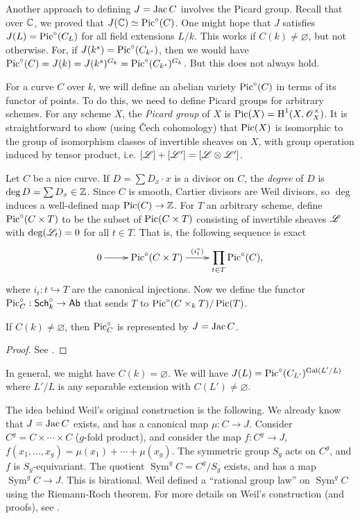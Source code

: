 \documentclass{article}
\begin{document}
Another approach to defining $J=\operatorname{Jac} C$ involves the Picard group. Recall 
that over $\mathbb{C}$, we proved that $J(\mathbb{C})\simeq\operatorname{Pic}^\circ(C)$. 
One might hope that $J$ satisfies $J(L)=\operatorname{Pic}^\circ(C_L)$ for all field 
extensions $L/k$. This works if $C(k)\ne\varnothing$, but not otherwise. For, 
if $J(k^s)=\operatorname{Pic}^\circ(C_{k^s})$, then we would have 
$\operatorname{Pic}^\circ(C) = J(k) = J(k^s)^{G_k} = \operatorname{Pic}^\circ(C_{k^s})^{G_k}$. But this 
does not always hold. 

For a curve $C$ over $k$, we will define an abelian variety $\operatorname{Pic}^\circ(C)$ in 
terms of its functor of points. To do this, we need to define Picard groups for 
arbitrary schemes. For any scheme $X$, the \emph{Picard group} of $X$ is 
$\operatorname{Pic}(X)=\operatorname{H}^1(X,\mathscr{O}_X^\times)$. It is straightforward to show (using \v Cech 
cohomology) that $\operatorname{Pic}(X)$ is isomorphic to the group of isomorphism classes of 
invertible sheaves on $X$, with group operation induced by tensor product, i.e. 
$[\mathscr{L}] + [\mathscr{L'}] = [\mathscr{L}\otimes \mathscr{L}']$. 

Let $C$ be a nice curve. If $D=\sum D_x\cdot x$ is a divisor on $C$, the 
\emph{degree} of $D$ is $\deg D=\sum D_x\in \mathbb{Z}$. Since $C$ is smooth, Cartier 
divisors are Weil divisors, so $\deg$ induces a well-defined map 
$\operatorname{Pic}(C)\to \mathbb{Z}$. For $T$ an arbitrary scheme, define 
$\operatorname{Pic}^\circ(C\times T)$ to be the subset of $\operatorname{Pic}(C\times T)$ consisting of 
invertible sheaves $\mathscr{L}$ with $\deg(\mathscr{L}_t)=0$ for all $t\in T$. That is, the 
following sequence is exact 
\[\xymatrix{
  0 \ar[r] 
    & \pic^\circ(C\times T) \ar[r]^-{(i_t^*)}
    & \displaystyle\prod_{t\in T} \pic^\circ (C)\text{,}
}\]
where $i_t:t\hookrightarrow T$ are the canonical injections. Now we define the 
functor $\operatorname{Pic}_C^\circ:\mathsf{Sch}_k^\circ\to\mathsf{Ab}$ that sends $T$ to 
$\operatorname{Pic}^\circ(C\times_k T)/\operatorname{Pic}(T)$. 

\begin{theorem}
If $C(k)\ne \varnothing$, then $\operatorname{Pic}_C^\circ$ is represented by $J=\operatorname{Jac} C$.
\end{theorem}
\begin{proof}
See \cite[III.1.2]{mi}.
\end{proof}

In general, we might have $C(k)=\varnothing$. We will have 
$J(L)=\operatorname{Pic}^\circ(C_{L'})^{\operatorname{Gal}(L'/L)}$ where $L'/L$ is any separable extension 
with $C(L')\ne\varnothing$. 

The idea behind Weil's original construction is the following. We already 
know that $J=\operatorname{Jac} C$ exists, and has a canonical map $\mu:C\to J$. Consider 
$C^g=C\times\cdots\times C$ ($g$-fold product), and consider the map 
$f:C^g\to J$, $f(x_1,\dotsc,x_g)=\mu(x_1)+\cdots+\mu(x_g)$. The symmetric 
group $S_g$ acts on $C^g$, and $f$ is $S_g$-equivariant. The quotient 
$\operatorname{Sym}^g C = C^g/S_g$ exists, and has a map 
$\operatorname{Sym}^g C\to J$. This is birational. Weil defined a ``rational 
group law'' on $\operatorname{Sym}^g C$ using the Riemann-Roch theorem. For 
more details on Weil's construction (and proofs), see \cite[III.7]{mi}. 
\end{document}

